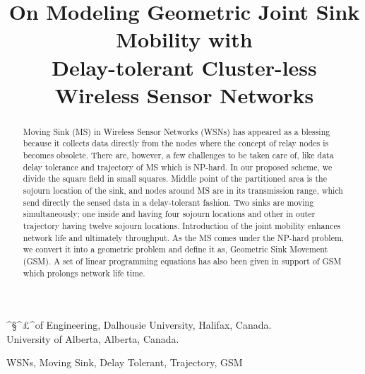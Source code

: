 \documentclass[conference]{IEEEtran}
\begin{document}
\title{On Modeling Geometric Joint Sink Mobility with\\ Delay-tolerant Cluster-less Wireless Sensor Networks}

^{\S}^{\pounds}^{\Faculty of Engineering, Dalhousie University, Halifax, Canada.\\
        University of Alberta, Alberta, Canada.}
\maketitle

\begin{abstract}
Moving Sink (MS) in Wireless Sensor Networks (WSNs) has appeared as a blessing because it collects data directly from the nodes where the concept of relay nodes is becomes obsolete. There are, however, a few challenges to be taken care of, like data delay tolerance and trajectory of MS which is NP-hard. In our proposed scheme, we divide the square field in small squares. Middle point of the partitioned area is the sojourn location of the sink, and nodes around MS are in its transmission range, which send directly the sensed data in a delay-tolerant fashion.  Two sinks are moving simultaneously; one inside and having four sojourn locations and other in outer trajectory having twelve sojourn locations. Introduction of the joint mobility enhances network life and ultimately throughput. As the MS comes under the NP-hard problem, we convert it into a geometric problem and define it as, Geometric Sink Movement (GSM). A set of linear programming equations has also been given in support of GSM which prolongs network life time.
 \end{abstract}
\IEEEpeerreviewmaketitle
\begin{IEEEkeywords}
WSNs, Moving Sink, Delay Tolerant, Trajectory, GSM
\end{IEEEkeywords}
\end{document}

